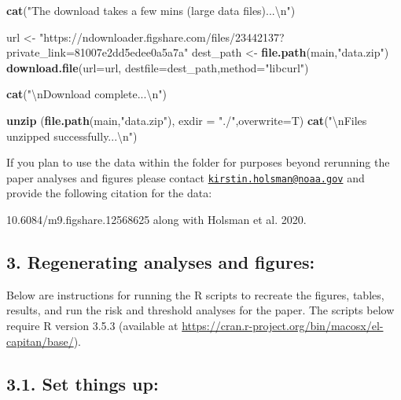 \documentclass[]{article}
\newenvironment{Shaded}{\begin{snugshade}}{\end{snugshade}}
\newcommand{\KeywordTok}[1]{\textcolor[rgb]{0.13,0.29,0.53}{\textbf{{#1}}}}
\newcommand{\DataTypeTok}[1]{\textcolor[rgb]{0.13,0.29,0.53}{{#1}}}
\newcommand{\CharTok}[1]{\textcolor[rgb]{0.31,0.60,0.02}{{#1}}}
\newcommand{\StringTok}[1]{\textcolor[rgb]{0.31,0.60,0.02}{{#1}}}
\newcommand{\NormalTok}[1]{{#1}}
\begin{document}
\begin{Shaded}
\begin{Highlighting}[]
    \KeywordTok{cat}\NormalTok{(}\StringTok{"The download takes a few mins (large data files)...}\CharTok{\textbackslash{}n}\StringTok{"}\NormalTok{)}

    \NormalTok{url <-}\StringTok{  "https://ndownloader.figshare.com/files/23442137?private_link=81007e2dd5edee0a5a7a"}
    \NormalTok{dest_path  <-}\StringTok{  }\KeywordTok{file.path}\NormalTok{(main,}\StringTok{"data.zip"}\NormalTok{)}
    \KeywordTok{download.file}\NormalTok{(}\DataTypeTok{url=}\NormalTok{url, }\DataTypeTok{destfile=}\NormalTok{dest_path,}\DataTypeTok{method=}\StringTok{"libcurl"}\NormalTok{)}
    
    \KeywordTok{cat}\NormalTok{(}\StringTok{"}\CharTok{\textbackslash{}n}\StringTok{Download complete...}\CharTok{\textbackslash{}n}\StringTok{"}\NormalTok{)}
    
    \KeywordTok{unzip} \NormalTok{(}\KeywordTok{file.path}\NormalTok{(main,}\StringTok{"data.zip"}\NormalTok{), }\DataTypeTok{exdir =} \StringTok{"./"}\NormalTok{,}\DataTypeTok{overwrite=}\NormalTok{T)}
    \KeywordTok{cat}\NormalTok{(}\StringTok{"}\CharTok{\textbackslash{}n}\StringTok{Files unzipped successfully...}\CharTok{\textbackslash{}n}\StringTok{"}\NormalTok{)}
\end{Highlighting}
\end{Shaded}

If you plan to use the data within the folder for purposes beyond
rerunning the paper analyses and figures please contact
\href{mailto:kirstin.holsman@noaa.gov}{\nolinkurl{kirstin.holsman@noaa.gov}}
and provide the following citation for the data:

10.6084/m9.figshare.12568625 along with Holsman et al. 2020.

\subsection{3. Regenerating analyses and
figures:}\label{regenerating-analyses-and-figures}

Below are instructions for running the R scripts to recreate the
figures, tables, results, and run the risk and threshold analyses for
the paper. The scripts below require R version 3.5.3 (available at
\url{https://cran.r-project.org/bin/macosx/el-capitan/base/}).

\subsection{3.1. Set things up:}\label{set-things-up}
\end{document}
